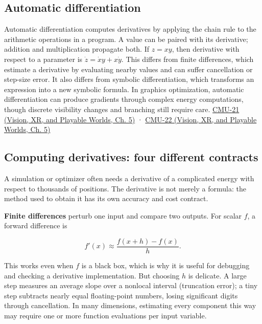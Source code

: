 \subsection{Automatic differentiation}\label{04-visual-computing-ii-ch029-automatic-differentiation}

Automatic differentiation computes derivatives by applying the chain rule to the arithmetic operations in a program. A value can be paired with its derivative; addition and multiplication propagate both. If \(z=xy\), then derivative with respect to a parameter is \(\dot z=\dot x y+x\dot y\). This differs from finite differences, which estimate a derivative by evaluating nearby values and can suffer cancellation or step-size error. It also differs from symbolic differentiation, which transforms an expression into a new symbolic formula. In graphics optimization, automatic differentiation can produce gradients through complex energy computations, though discrete visibility changes and branching still require care. \href{../07-Vision-XR-and-Playable-Worlds/main.pdf\#nameddest=04-visual-computing-ii-ch036-cmu-21---dynamics-and-time-integration}{CMU-21 (Vision, XR, and Playable Worlds, Ch. 5)} · \href{../07-Vision-XR-and-Playable-Worlds/main.pdf\#nameddest=04-visual-computing-ii-ch036-cmu-22---optimization}{CMU-22 (Vision, XR, and Playable Worlds, Ch. 5)}

\subsection{Computing derivatives: four different contracts}\label{04-visual-computing-ii-ch029-computing-derivatives-four-different-contracts}

A simulation or optimizer often needs a derivative of a complicated energy with respect to thousands of positions. The derivative is not merely a formula: the method used to obtain it has its own accuracy and cost contract.

\textbf{Finite differences} perturb one input and compare two outputs. For scalar \(f\), a forward difference is

\[
f'(x)\approx\frac{f(x+h)-f(x)}{h}.
\]

This works even when \(f\) is a black box, which is why it is useful for debugging and checking a derivative implementation. But choosing \(h\) is delicate. A large step measures an average slope over a nonlocal interval (truncation error); a tiny step subtracts nearly equal floating-point numbers, losing significant digits through cancellation. In many dimensions, estimating every component this way may require one or more function evaluations per input variable.

